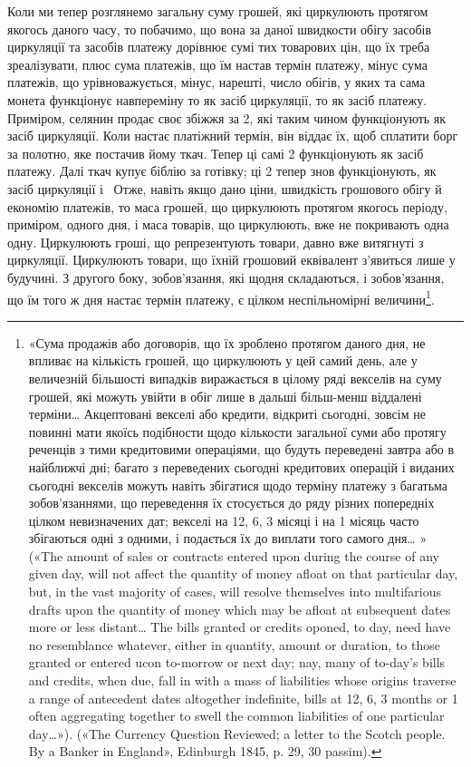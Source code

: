 Коли ми тепер розглянемо загальну суму грошей, які циркулюють протягом якогось даного часу, то
побачимо, що вона за даної швидкости обігу засобів циркуляції та засобів платежу дорівнює сумі тих
товарових цін, що їх треба зреалізувати, плюс сума платежів, що їм настав термін платежу, мінус сума
платежів, що урівноважується, мінус, нарешті, число обігів, у яких та сама монета функціонує
навпереміну то як засіб циркуляції, то як засіб платежу. Приміром, селянин продає своє збіжжя за 2, які таким чином функціонують як засіб циркуляції. Коли настає платіжний термін,
він віддає їх, щоб сплатити борг за полотно, яке постачив йому ткач. Тепер ці самі 2 функціонують як засіб платежу. Далі ткач купує біблію за готівку; ці 2
тепер знов функціонують,
як засіб циркуляції і~ Отже, навіть якщо дано ціни, швидкість грошового обігу й
економію платежів, то маса грошей, що циркулюють протягом якогось періоду, приміром, одного дня, і
маса товарів, що циркулюють, вже не покривають одна одну. Циркулюють гроші, що репрезентують товари,
давно вже витягнуті з циркуляції. Циркулюють товари, що їхній грошовий еквівалент з’явиться лише у
будучині. З другого боку, зобов’язання, які щодня складаються, і зобов’язання, що їм того ж дня
настає термін платежу, є цілком неспільномірні величини\footnote{
«Сума продажів або договорів, що їх зроблено протягом даного дня, не впливає на кількість
грошей, що циркулюють у цей самий день, але у величезній більшості випадків виражається в цілому
ряді векселів на суму грошей, які можуть увійти в обіг лише в дальші більш-менш віддалені терміни\dots{}
Акцептовані векселі або кредити, відкриті сьогодні, зовсім не повинні мати якоїсь подібности щодо
кількости загальної суми або протягу реченців з тими кредитовими операціями, що будуть переведені
завтра або в найближчі дні; багато з переведених сьогодні кредитових операцій і виданих сьогодні
векселів можуть навіть збігатися щодо терміну платежу з багатьма зобов’язаннями, що переведення їх
стосується до ряду різних попередніх цілком невизначених дат; векселі на 12, 6, 3 місяці і на 1
місяць часто збігаються одні з одними, і подається їх до виплати того самого дня\dots{} » («The amount
of sales or contracts entered upon during the course of any given day, will not affect the quantity
of money afloat on that particular day, but, in the vast majority of cases, will resolve themselves
into multifarious drafts upon the quantity of money which may be afloat at subsequent dates more or
less distant\dots{} The bills granted or credits oponed, to day, need have no resemblance whatever,
either in quantity, amount or duration, to those granted or entered ucon to-morrow or next day; nay,
many of to-day’s bills and credits, when due, fall in with a mass of liabilities whose origins
traverse a range of antecedent dates altogether indefinite, bills at 12, 6, 3 months or 1 often
aggregating together to swell the common liabilities of one particular day\dots{}»). («The Currency
Question Reviewed; a letter to the Scotch people. By a Banker in England», Edinburgh 1845, p. 29, 30
passim).
}.

